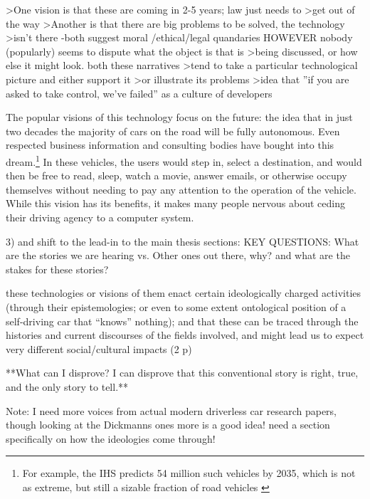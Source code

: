 >One vision is that these are coming in 2-5 years; law just needs to
>get out of the way
>Another is that there are big problems to be solved, the technology
>isn't there
-both suggest moral /ethical/legal quandaries
HOWEVER nobody (popularly) seems to dispute what the object is that is
>being discussed, or how else it might look. both these narratives
>tend to take a particular technological picture and either support it
>or illustrate its problems
>idea that ''if you are asked to take control, we've failed'' as a culture of developers

The popular visions of this technology focus on the future: the
idea that in just two decades the majority of cars on the road will be
fully autonomous. Even respected business information and consulting
bodies have bought into this dream.\footnote{For example, the IHS
  predicts 54 million such vehicles by 2035, which is not as extreme,
  but still a sizable fraction of road vehicles \cite{IHSstudy}} In these vehicles, the users would
step in, select a destination, and would then be free to read, sleep,
watch a movie, answer emails, or otherwise occupy themselves without
needing to pay any attention to the operation of the vehicle. While this
vision has its benefits, it makes many people nervous about
ceding their driving agency to a computer system.\cite{clytton}



3) and shift to the lead-in to the main thesis sections: 
KEY QUESTIONS: What are the stories we are hearing vs. Other ones out
there, why? and what are the stakes for these stories?

these technologies or visions of them enact certain ideologically charged
activities (through their epistemologies; or even to some extent
ontological position of a self-driving car that ``knows'' nothing);
and that these can be traced through the histories and current
discourses of the fields involved, and might lead us to expect very
different social/cultural impacts (2 p)

**What can I disprove?
I can disprove that this conventional story is right, true, and the
only story to tell.**

Note: I need more voices from actual modern driverless car research
papers, though looking at the Dickmanns ones more is a good idea! need
a section specifically on how the ideologies come through!

